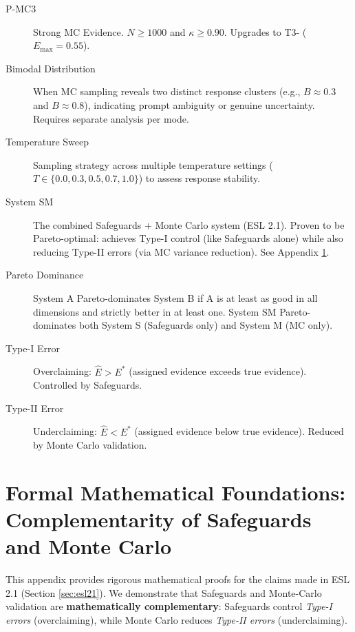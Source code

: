 \documentclass[11pt,a4paper]{article}
\begin{document}
\begin{description}
    \item[P-MC3] Strong MC Evidence. $N \geq 1000$ and $\kappa \geq 0.90$. Upgrades to T3- ($E_{\max} = 0.55$).

    \item[Bimodal Distribution] When MC sampling reveals two distinct response clusters (e.g., $B \approx 0.3$ and $B \approx 0.8$), indicating prompt ambiguity or genuine uncertainty. Requires separate analysis per mode.

    \item[Temperature Sweep] Sampling strategy across multiple temperature settings ($T \in \{0.0, 0.3, 0.5, 0.7, 1.0\}$) to assess response stability.

    \item[System SM] The combined Safeguards + Monte Carlo system (ESL 2.1). Proven to be Pareto-optimal: achieves Type-I control (like Safeguards alone) while also reducing Type-II errors (via MC variance reduction). See Appendix \ref{app:math-foundations}.

    \item[Pareto Dominance] System A Pareto-dominates System B if A is at least as good in all dimensions and strictly better in at least one. System SM Pareto-dominates both System S (Safeguards only) and System M (MC only).

    \item[Type-I Error] Overclaiming: $\hat{E} > E^*$ (assigned evidence exceeds true evidence). Controlled by Safeguards.

    \item[Type-II Error] Underclaiming: $\hat{E} < E^*$ (assigned evidence below true evidence). Reduced by Monte Carlo validation.
\end{description}


\section{Formal Mathematical Foundations: Complementarity of Safeguards and Monte Carlo}
\label{app:math-foundations}

This appendix provides rigorous mathematical proofs for the claims made in ESL 2.1 (Section \ref{sec:esl21}). We demonstrate that Safeguards and Monte-Carlo validation are \textbf{mathematically complementary}: Safeguards control \textit{Type-I errors} (overclaiming), while Monte Carlo reduces \textit{Type-II errors} (underclaiming).
\end{document}
